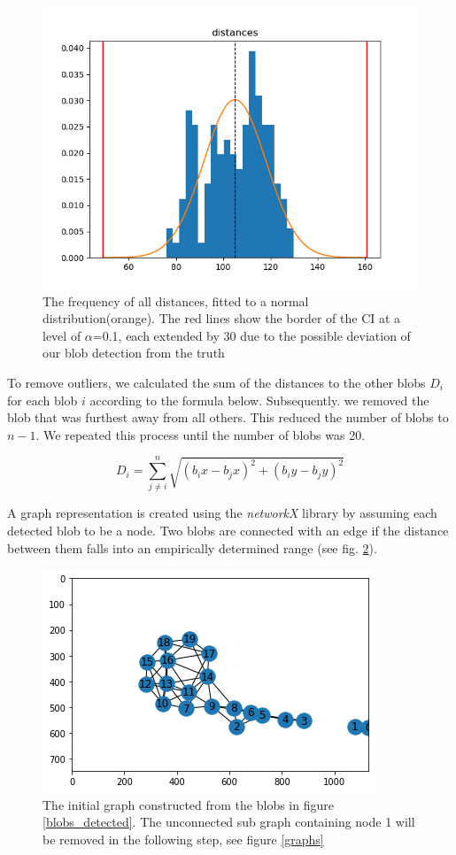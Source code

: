 \documentclass[a4paper, 10pt, twocolumn]{article}
\begin{document}
\begin{figure}[ht]
	\centering
  \includegraphics[width=.5\textwidth]{distances_distribution.png}
	\caption{The frequency of all distances, fitted to a normal distribution(orange). The red lines show the border of the CI at a level of $\alpha$=0.1, each extended by 30 due to the possible deviation of our blob detection from the truth} %
	\label{dist_distribution}
\end{figure}
To remove outliers, we calculated the sum of the distances to the other blobs $D_{i}$ for each blob $i$ according to the formula below. Subsequently. we removed the blob that was furthest away from all others. This reduced the number of blobs to $n-1$. We repeated this process until the number of blobs was 20.

$$D_{i}=\sum_{j\neq i}^{n} \sqrt{(b_ix-b_jx)^2+(b_iy-b_jy)^2}$$

A graph representation is created using the \emph{networkX} library \cite{networkx} by assuming each detected blob to be a node. Two blobs are connected with an edge if the distance between them falls into an empirically determined range (see fig. \ref{network_raw}). %

\begin{figure}[ht]
	\centering
  \includegraphics[width=.5\textwidth]{network_raw.png}
	\caption{The initial graph constructed from the blobs in figure \ref{blobs_detected}. The unconnected sub graph containing node 1 will be removed in the following step, see figure \ref{graphs}}
	\label{network_raw}
\end{figure}
\end{document}
